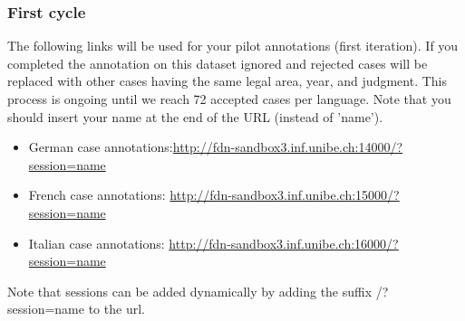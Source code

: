 \documentclass{article}
\begin{document}
\subsubsection{First cycle}\label{1_cycle}
The following links will be used for your pilot annotations (first iteration). If you completed the annotation on this dataset ignored and rejected cases will be replaced with other cases having the same legal area, year, and judgment. This process is ongoing until we reach 72 accepted cases per language. Note that you should insert your name at the end of the URL (instead of 'name').
\begin{itemize}
\item German case annotations:\href{http://fdn-sandbox3.inf.unibe.ch:14000/?session=name}{http://fdn-sandbox3.inf.unibe.ch:14000/?session=name}
    \item French case annotations: \href{http://fdn-sandbox3.inf.unibe.ch:15000/?session=name}{http://fdn-sandbox3.inf.unibe.ch:15000/?session=name}
    \item Italian case annotations: \href{http://fdn-sandbox3.inf.unibe.ch:16000/?session=name}{http://fdn-sandbox3.inf.unibe.ch:16000/?session=name}
\end{itemize}
Note that sessions can be added dynamically by adding the suffix {\color{blue}/?session=name} to the url.

\end{document}
